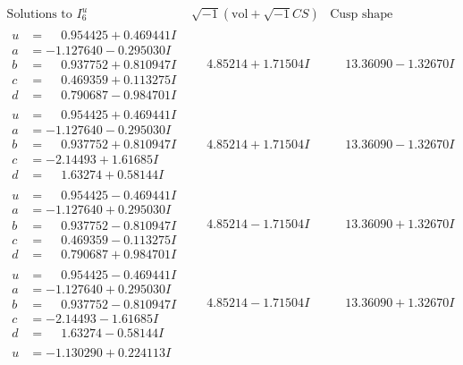 \documentclass[1p]{elsarticle_modified}
\theoremstyle{definition}
\newcommand{\I}{\sqrt{-1}}
\begin{document}
$$\begin{array}{c|c|c}  
\text{Solutions to }I^u_{6}& \I (\text{vol} + \sqrt{-1}CS) & \text{Cusp shape}\\
 \hline 
\begin{aligned}
u &= \phantom{-}0.954425 + 0.469441 I \\
a &= -1.127640 - 0.295030 I \\
b &= \phantom{-}0.937752 + 0.810947 I \\
c &= \phantom{-}0.469359 + 0.113275 I \\
d &= \phantom{-}0.790687 - 0.984701 I\end{aligned}
 & \phantom{-}4.85214 + 1.71504 I & \phantom{-}13.36090 - 1.32670 I \\ \hline\begin{aligned}
u &= \phantom{-}0.954425 + 0.469441 I \\
a &= -1.127640 - 0.295030 I \\
b &= \phantom{-}0.937752 + 0.810947 I \\
c &= -2.14493 + 1.61685 I \\
d &= \phantom{-}1.63274 + 0.58144 I\end{aligned}
 & \phantom{-}4.85214 + 1.71504 I & \phantom{-}13.36090 - 1.32670 I \\ \hline\begin{aligned}
u &= \phantom{-}0.954425 - 0.469441 I \\
a &= -1.127640 + 0.295030 I \\
b &= \phantom{-}0.937752 - 0.810947 I \\
c &= \phantom{-}0.469359 - 0.113275 I \\
d &= \phantom{-}0.790687 + 0.984701 I\end{aligned}
 & \phantom{-}4.85214 - 1.71504 I & \phantom{-}13.36090 + 1.32670 I \\ \hline\begin{aligned}
u &= \phantom{-}0.954425 - 0.469441 I \\
a &= -1.127640 + 0.295030 I \\
b &= \phantom{-}0.937752 - 0.810947 I \\
c &= -2.14493 - 1.61685 I \\
d &= \phantom{-}1.63274 - 0.58144 I\end{aligned}
 & \phantom{-}4.85214 - 1.71504 I & \phantom{-}13.36090 + 1.32670 I \\ \hline\begin{aligned}
u &= -1.130290 + 0.224113 I \\

\end{aligned}
\end{array}$$
\end{document}
